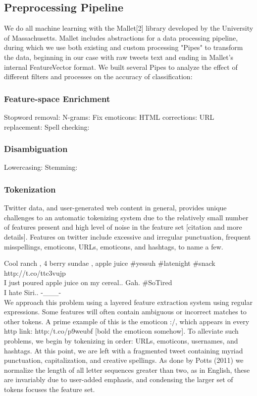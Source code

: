 \documentclass[letterpaper]{article}
\begin{document}
\subsection{Preprocessing Pipeline}

We do all machine learning with the Mallet[2] library developed by the University of Massachusetts. Mallet includes abstractions for a data processing pipeline, during which we use both existing and custom processing "Pipes" to transform the data, beginning in our case with raw tweets text and ending in Mallet's internal FeatureVector format. We built several Pipes to analyze the effect of different filters and processes on the accuracy of classification:

\subsubsection{Feature-space Enrichment}
Stopword removal:
N-grams:
Fix emoticons:
HTML corrections: 
URL replacement:
Spell checking:

\subsubsection{Disambiguation}
Lowercasing:
Stemming:

\subsubsection{Tokenization}
Twitter data, and user-generated web content in general, provides unique challenges to an automatic tokenizing system due to the relatively small number of features present and high level of noise in the feature set [citation and more details]. Features on twitter include excessive and irregular punctuation, frequent misspellings, emoticons, URLs, emoticons, and hashtags, to name a few.

Cool ranch , 4 berry sundae , apple juice #yessuh #latenight #snack http://t.co/ttc3vujp \\
I just poured apple juice on my cereal.. Gah. #SoTired \\
I hate Siri.. -___- \\

We approach this problem using a layered feature extraction system using regular expressions. Some features will often contain ambiguous or incorrect matches to other tokens. A prime example of this is the emoticon :/, which appears in every http link: http:/t.co/p9weubf [bold the emoticon somehow]. To alleviate such problems, we begin by tokenizing in order: URLs, emoticons, usernames, and hashtags. At this point, we are left with a fragmented tweet containing myriad punctuation, capitalization, and creative spellings. As done by Potts (2011) we normalize the length of all letter sequences greater than two, as in English, these are invariably due to user-added emphasis, and condensing the larger set of tokens focuses the feature set.\\
\end{document}
